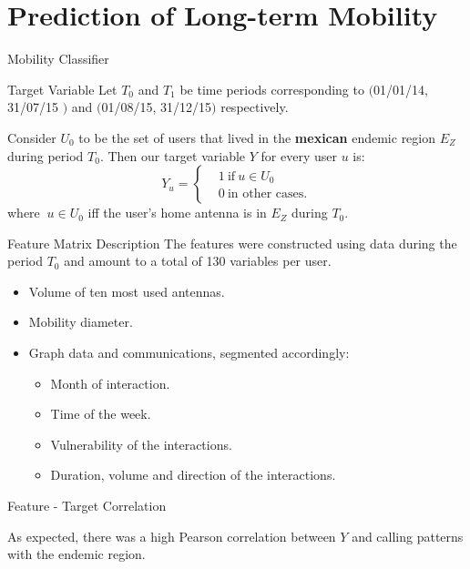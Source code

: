 \documentclass{beamer}
\begin{document}
\section{Prediction of Long-term Mobility}
\begin{frame}{Mobility Classifier}
			\begin{block}{Target Variable}
			Let $T_0$ and $T_1$ be time periods corresponding to $($01/01/14, 31/07/15 $)$ and $($01/08/15, 31/12/15$)$ respectively.
			
			Consider $U_0$ to be the set of users that lived in the \textbf{mexican} endemic region $E_Z$ during period $T_0$. Then our target variable $Y$ for every user $u$ is:  
			\[
			Y_u =
			\begin{cases}
			&1 \ \mbox{if} \ u \in U_0  \\
			&0 \ \mbox{in other cases}.
			\end{cases}
			\]
			where $\ u \in U_0$ iff the user's home antenna is in $E_Z$ during $T_0$.
			\end{block}
	
\end{frame}

\begin{frame}{Feature Matrix Description}
	The features were constructed using data during the period $T_0$ and amount to a total of 130 variables per user.
	
	\begin{itemize}
		\item Volume of ten most used antennas.
		\item Mobility diameter.
		\item Graph data and communications, segmented accordingly:
		\begin{itemize}
			\item Month of interaction.
			\item Time of the week.
			\item Vulnerability of the interactions.
			\item Duration, volume and direction of the interactions.
		\end{itemize}
	\end{itemize}
	
	\begin{block}{Feature - Target Correlation}
		
	As expected, there was a high Pearson correlation between $Y$ and calling patterns with the endemic region. 
	\end{block}
		
\end{frame}
\end{document}
